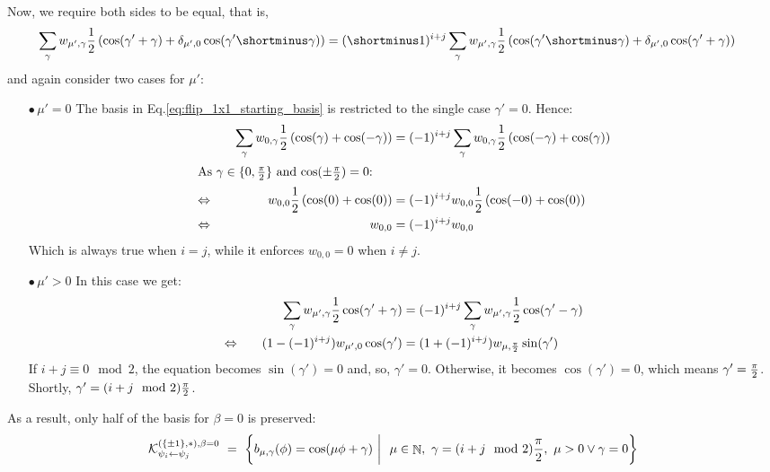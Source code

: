 \documentclass{article}
\newcommand{\lp}{\left(}
\newcommand{\rp}{\right)}
\DeclareMathOperator*{\N}{\mathbb{N}}
\newcommand{\Flip}{(\{\pm 1\}, *)}
\begin{document}
Now, we require both sides to be equal, that is, \begin{align*}
\sum_{\gamma} w_{\mu',\gamma} {1\over2} \lp \cos(\gamma'+ \gamma) + \delta_{\mu', 0}\cos(\gamma'\shortminus\gamma)\rp &=
(\shortminus1)^{i+j} \sum_{\gamma} w_{\mu',\gamma} {1\over2} \lp \cos(\gamma'\shortminus \gamma) + \delta_{\mu', 0}\cos(\gamma'+\gamma)\rp
\end{align*}
and again consider two cases for $\mu'$:
\begin{itemize}
	\item[$\bullet\,\mu' = 0$]
		The basis in Eq.\eqref{eq:flip_1x1_starting_basis} is restricted to the single case $\gamma' = 0$. Hence:
		\begin{align*}
			&& \sum_{\gamma} w_{0,\gamma} {1\over2} \lp \cos(\gamma) + \cos(-\gamma)\rp &= (-1)^{i+j} \sum_{\gamma} w_{0,\gamma} {1\over2} \lp \cos(- \gamma) + \cos(\gamma)\rp\\
		\intertext{As $\gamma \in \{0, {\pi\over 2}\}$ and $\cos(\pm{\pi\over 2}) = 0$:}
			\Leftrightarrow\quad&& w_{0,0} {1\over2} \lp \cos(0) + \cos(0)\rp &= (-1)^{i+j} w_{0,0} {1\over2} \lp \cos(- 0) + \cos(0)\rp \\
			\Leftrightarrow\quad&& w_{0,0} &= (-1)^{i+j} w_{0,0}\\
		\end{align*}
		Which is always true when $i = j$, while it enforces $w_{0,0} = 0$ when $i \neq j$.
	\item[$\bullet\,\mu' > 0$] In this case we get:
		\begin{align*}
								&&
			\sum_{\gamma} w_{\mu',\gamma} {1\over2} \cos(\gamma'+ \gamma) &= (-1)^{i+j} \sum_{\gamma} w_{\mu',\gamma} {1\over2} \cos(\gamma'- \gamma)\\
			\Leftrightarrow\quad&&
			(1 - (-1)^{i+j})w_{\mu',0} \cos(\gamma') &= (1 + (-1)^{i+j})w_{\mu, {\pi\over2}}\sin(\gamma') 
		\end{align*}
		If $i + j \equiv 0 \mod 2$, the equation becomes $\sin(\gamma') = 0$ and, so, $\gamma' = 0$.
		Otherwise, it becomes $\cos(\gamma') = 0$, which means $\gamma' = {\pi\over2}$.
		Shortly, $\gamma' = (i+j \mod 2) {\pi\over2}$.
\end{itemize}

As a result, only half of the basis for $\beta=0$ is preserved: \begin{align}
\label{eq:flip_1x1_basis}
\mathcal{K}^{\Flip,\beta=0}_{\psi_i\leftarrow\psi_j}\ =\ 
	\left\{ b_{\mu,\gamma}(\phi) = \cos(\mu\phi +\gamma) \ \bigg|\ \ \mu \in \N,\ \gamma = (i+j \mod 2){\pi\over2},\ \mu > 0 \vee \gamma = 0 \right\}
\end{align}
\end{document}
